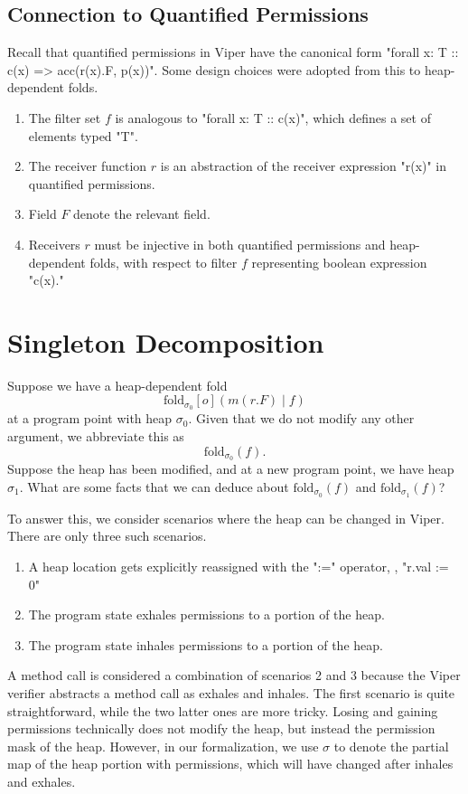 \documentclass[msc,oneside]{ubcthesis}
\begin{document}
\subsection{Connection to Quantified Permissions}
Recall that quantified permissions in Viper have the canonical form "forall x: T :: c(x) => acc(r(x).F, p(x))". Some design choices were adopted from this to heap-dependent folds.

\begin{enumerate}
    \item The filter set $f$ is analogous to "forall x: T :: c(x)", which defines a set of elements typed "T".
    \item The receiver function $r$ is an abstraction of the receiver expression "r(x)" in quantified permissions.
    \item Field $F$ denote the relevant field.
    \item Receivers $r$ must be injective in both quantified permissions and heap-dependent folds, with respect to filter $f$ representing boolean expression "c(x)." 
\end{enumerate}

\section{Singleton Decomposition}
Suppose we have a heap-dependent fold $$\textrm{fold}_{\sigma_0}[o]( m(r.F) \mid f)$$ at a program point with heap $\sigma_0$. Given that we do not modify any other argument, we abbreviate this as $$\textrm{fold}_{\sigma_0}(f).$$ Suppose the heap has been modified, and at a new program point, we have heap $\sigma_1$. What are some facts that we can deduce about $\textrm{fold}_{\sigma_0}(f)$ and $\textrm{fold}_{\sigma_1}(f)$?

To answer this, we consider scenarios where the heap can be changed in Viper. There are only three such scenarios.
\begin{enumerate}
    \item A heap location gets explicitly reassigned with the ":=" operator, \eg, "r.val := 0"
    \item The program state exhales permissions to a portion of the heap. 
    \item The program state inhales permissions to a portion of the heap. 
\end{enumerate}
A method call is considered a combination of scenarios 2 and 3 because the Viper verifier abstracts a method call as exhales and inhales. The first scenario is quite straightforward, while the two latter ones are more tricky. Losing and gaining permissions technically does not modify the heap, but instead the permission mask of the heap. However, in our formalization, we use $\sigma$ to denote the partial map of the heap portion with permissions, which will have changed after inhales and exhales. 
\end{document}
